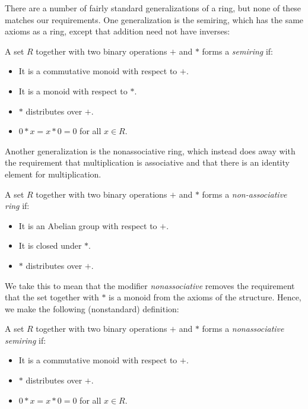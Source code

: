 There are a number of fairly standard  generalizations of a ring, but none of these matches our requirements. One generalization is the semiring, which has the same axioms as a ring, except that addition need not have inverses:
\begin{Definition}
A set $R$ together with two binary operations $+$ and $*$ forms a \emph{semiring} if:
\begin{itemize}
\item It is a commutative monoid with respect to $+$.
\item It is a monoid with respect to $*$.
\item $*$ distributes over $+$.
\item $0 * x = x * 0 = 0$ for all $x \in R$.
\end{itemize}
\end{Definition}
Another generalization is the nonassociative ring, which instead does away with the requirement that multiplication is associative and that there is an identity element for multiplication.
\begin{Definition}
A set $R$ together with two binary operations $+$ and $*$ forms a \emph{non-associative ring} if:
\begin{itemize}
\item It is an Abelian group with respect to $+$.
\item It is closed under $*$.
\item $*$ distributes over $+$.
\end{itemize}
\end{Definition}
We take this to mean that the modifier \emph{nonassociative} removes the requirement that the set together with $*$ is a monoid from the axioms of the structure. Hence, we make the following (nonstandard) definition:
\begin{Definition}
A set $R$ together with two binary operations $+$ and $*$ forms a \emph{nonassociative semiring} if:
\begin{itemize}
\item It is a commutative monoid with respect to $+$.
\item $*$ distributes over $+$.
\item $0 * x = x * 0 = 0$ for all $x \in R$.
\end{itemize}
\end{Definition}

